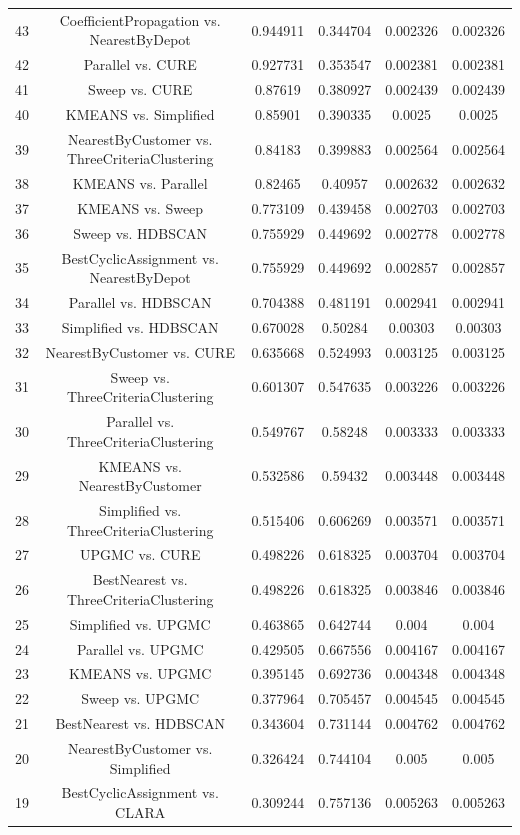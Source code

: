 \documentclass[a4paper,10pt]{article}
\begin{document}
\begin{landscape}
\begin{table}[!htp]
\begin{tabular}{cccccc}
43&CoefficientPropagation vs. NearestByDepot&0.944911&0.344704&0.002326&0.002326\\
42&Parallel vs. CURE&0.927731&0.353547&0.002381&0.002381\\
41&Sweep vs. CURE&0.87619&0.380927&0.002439&0.002439\\
40&KMEANS vs. Simplified&0.85901&0.390335&0.0025&0.0025\\
39&NearestByCustomer vs. ThreeCriteriaClustering&0.84183&0.399883&0.002564&0.002564\\
38&KMEANS vs. Parallel&0.82465&0.40957&0.002632&0.002632\\
37&KMEANS vs. Sweep&0.773109&0.439458&0.002703&0.002703\\
36&Sweep vs. HDBSCAN&0.755929&0.449692&0.002778&0.002778\\
35&BestCyclicAssignment vs. NearestByDepot&0.755929&0.449692&0.002857&0.002857\\
34&Parallel vs. HDBSCAN&0.704388&0.481191&0.002941&0.002941\\
33&Simplified vs. HDBSCAN&0.670028&0.50284&0.00303&0.00303\\
32&NearestByCustomer vs. CURE&0.635668&0.524993&0.003125&0.003125\\
31&Sweep vs. ThreeCriteriaClustering&0.601307&0.547635&0.003226&0.003226\\
30&Parallel vs. ThreeCriteriaClustering&0.549767&0.58248&0.003333&0.003333\\
29&KMEANS vs. NearestByCustomer&0.532586&0.59432&0.003448&0.003448\\
28&Simplified vs. ThreeCriteriaClustering&0.515406&0.606269&0.003571&0.003571\\
27&UPGMC vs. CURE&0.498226&0.618325&0.003704&0.003704\\
26&BestNearest vs. ThreeCriteriaClustering&0.498226&0.618325&0.003846&0.003846\\
25&Simplified vs. UPGMC&0.463865&0.642744&0.004&0.004\\
24&Parallel vs. UPGMC&0.429505&0.667556&0.004167&0.004167\\
23&KMEANS vs. UPGMC&0.395145&0.692736&0.004348&0.004348\\
22&Sweep vs. UPGMC&0.377964&0.705457&0.004545&0.004545\\
21&BestNearest vs. HDBSCAN&0.343604&0.731144&0.004762&0.004762\\
20&NearestByCustomer vs. Simplified&0.326424&0.744104&0.005&0.005\\
19&BestCyclicAssignment vs. CLARA&0.309244&0.757136&0.005263&0.005263\\

\end{tabular}
\end{table}
\end{landscape}
\end{document}
